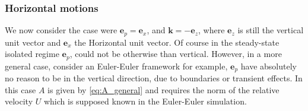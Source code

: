 \subsubsection{Horizontal motions}

We now consider the case were $\textbf{e}_p = \textbf{e}_x$, and $\textbf{k} = - \textbf{e}_z$, where $\textbf{e}_z$ is still the vertical unit vector and $\textbf{e}_x$ the Horizontal unit vector. 
Of course in the steady-state isolated regime $\textbf{e}_p$, could not be otherwise than vertical. 
However, in a more general case, consider an Euler-Euler framework for example, $\textbf{e}_p$ have absolutely no reason to be in the vertical direction, due to boundaries or transient effects. 
In this case $A$ is given by \ref{eq:A_general} and requires the norm of the relative velocity $U$ which is supposed known in the Euler-Euler simulation. 


